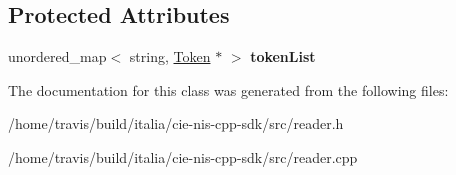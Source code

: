 \subsection*{Protected Attributes}
\begin{DoxyCompactItemize}
\item 
\hypertarget{classnis_1_1interface_1_1Reader_a0254ae695f91bd951524e337b4896a06}{unordered\-\_\-map$<$ string, \hyperlink{classnis_1_1interface_1_1Token}{Token} $\ast$ $>$ {\bfseries token\-List}}\label{classnis_1_1interface_1_1Reader_a0254ae695f91bd951524e337b4896a06}

\end{DoxyCompactItemize}


The documentation for this class was generated from the following files\-:\begin{DoxyCompactItemize}
\item 
/home/travis/build/italia/cie-\/nis-\/cpp-\/sdk/src/reader.\-h\item 
/home/travis/build/italia/cie-\/nis-\/cpp-\/sdk/src/reader.\-cpp\end{DoxyCompactItemize}
